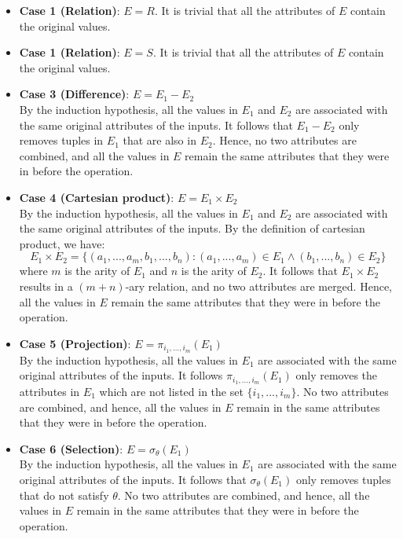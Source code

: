   \begin{itemize}
    \item \textbf{Case 1 (Relation)}: $E = R$. It is trivial that all the attributes of $E$ contain the original values.
    \item \textbf{Case 1 (Relation)}: $E = S$. It is trivial that all the attributes of $E$ contain the original values.
    \item \textbf{Case 3 (Difference)}: $E = E_1 - E_2$ \\
    By the induction hypothesis, all the values in $E_1$ and $E_2$ are associated with the same original attributes of the 
    inputs. It follows that $E_1 - E_2$ only removes tuples in $E_1$ that are also in $E_2$. Hence, no two attributes are 
    combined, and all the values in $E$ remain the same attributes that they were in before the operation. 
     
    \item \textbf{Case 4 (Cartesian product)}: $E = E_1 \times E_2$ \\
    By the induction hypothesis, all the values in $E_1$ and $E_2$ are associated with the same original attributes of the 
    inputs. By the definition of cartesian product, we have:
    \begin{equation*}
      E_1 \times E_2 = \{(a_1,...,a_m,b_1,...,b_n) : (a_1,...,a_m) \in E_1 \land (b_1,...,b_n) \in E_2\}
    \end{equation*}
    where $m$ is the arity of $E_1$ and $n$ is the arity of $E_2$. It follows that $E_1 \times E_2$ results in a $(m+n)$-ary 
    relation, and no two attributes are merged. Hence, all the values in $E$ remain the same attributes that they were in 
    before the operation. 

    \item \textbf{Case 5 (Projection)}: $E = \pi_{i_1,...,i_m}(E_1)$ \\
    By the induction hypothesis, all the values in $E_1$ are associated with the same original attributes of the inputs. It 
    follows $\pi_{i_1,...,i_m}(E_1)$ only removes the attributes in $E_1$ which are not listed in the set $\{i_1,...,i_m\}$. 
    No two attributes are combined, and hence, all the values in $E$ remain in the same attributes that they were in before 
    the operation.

    \item \textbf{Case 6 (Selection)}: $E = \sigma_{\theta}(E_1)$ \\
    By the induction hypothesis, all the values in $E_1$ are associated with the same original attributes of the inputs. It 
    follows that $\sigma_{\theta}(E_1)$ only removes tuples that do not satisfy $\theta$. No two attributes are 
    combined, and hence, all the values in $E$ remain in the same attributes that they were in before the 
    operation. 
  \end{itemize}  